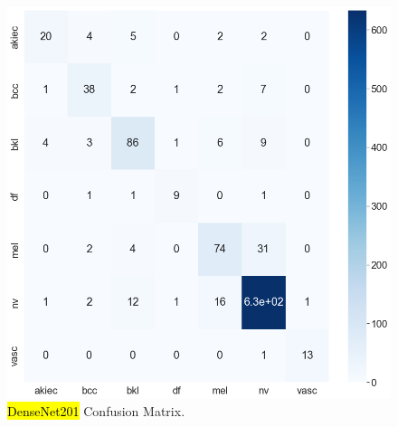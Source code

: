 \documentclass[sensors,article,accept,pdftex,moreauthors]{Definitions/mdpi}
\begin{document}
	\begin{figure}[H]
		\begin{minipage}{0.48\textwidth}
\centering
\includegraphics[width=1.2\linewidth]{Definitions/CM/dn201cm}
		\end{minipage}
\caption{\hl{DenseNet201} %
 Confusion Matrix.}\label{fig:densenet201cm}
		\end{figure}\unskip
		
\end{document}
